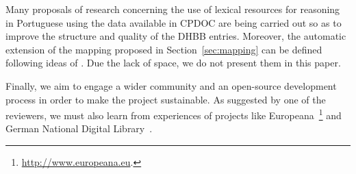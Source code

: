 
Many proposals of research concerning the use of lexical resources for
reasoning in Portuguese using the data available in CPDOC are being
carried out so as to improve the structure and quality of the DHBB
entries. Moreover, the automatic extension of the mapping proposed in
Section~\ref{sec:mapping} can be defined following ideas of
\cite{onto-context}. Due the lack of space, we do not present them in this
paper.

Finally, we aim to engage a wider community and an open-source
development process in order to make the project sustainable. As
suggested by one of the reviewers, we must also learn from experiences
of projects like Europeana~\footnote{\url{http://www.europeana.eu}.}
and German National Digital Library~\cite{IAIS-Cortex}.


